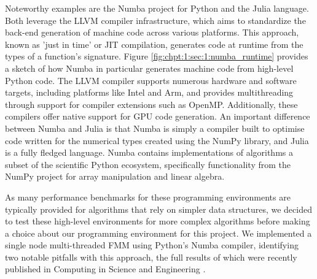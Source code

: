 Noteworthy examples are the Numba project for Python and the Julia language. Both leverage the LLVM compiler infrastructure, which aims to standardize the back-end generation of machine code across various platforms. This approach, known as 'just in time' or JIT compilation, generates code at runtime from the types of a function's signature. Figure \ref{fig:chpt:1:sec:1:numba_runtime} provides a sketch of how Numba in particular generates machine code from high-level Python code. The LLVM compiler supports numerous hardware and software targets, including platforms like Intel and Arm, and provides multithreading through support for compiler extensions such as OpenMP. Additionally, these compilers offer native support for GPU code generation. An important difference between Numba and Julia is that Numba is simply a compiler built to optimise code written for the numerical types created using the NumPy library, and Julia is a fully fledged language. Numba contains implementations of algorithms a subset of the scientific Python ecosystem, specifically functionality from the NumPy project for array manipulation and linear algebra.


As many performance benchmarks for these programming environments are typically provided for algorithms that rely on simpler data structures, we decided to test these high-level environments for more complex algorithms before making a choice about our programming environment for this project. We implemented a single node multi-threaded FMM using Python's Numba compiler, identifying two notable pitfalls with this approach, the full results of which were recently published in Computing in Science and Engineering \cite{kailasa2022pyexafmm}.

